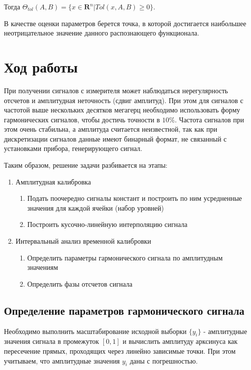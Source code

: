 \documentclass[12pt,a4paper]{article}
\begin{document}
Тогда $\Theta_{tol}(A,B)=\{x\in{\mathbf{R}^n}|Tol(x,A,B)\geq0\}$.

В качестве оценки параметров берется точка, в которой достигается наибольшее неотрицательное значение данного распознающего функционала.

\section{Ход работы}
При получении сигналов с измерителя может наблюдаться нерегулярность отсчетов и амплитудная неточность (сдвиг амплитуд). При этом для сигналов с частотой выше нескольких десятков мегагерц необходимо использовать форму гармонических сигналов, чтобы достичь точности в $10\%$. Частота сигналов при этом очень стабильна, а амплитуда считается неизвестной, так как при дискретизации сигналов данные имеют бинарный формат, не связанный с установками прибора, генерирующего сигнал.

Таким образом, решение задачи разбивается на этапы:
\begin{enumerate}
    \item Амплитудная калибровка
        \begin{enumerate}
            \item Подать поочередно сигналы констант и построить по ним усредненные значения для каждой ячейки (набор уровней)
            \item Построить кусочно-линейную интерполяцию сигнала 
        \end{enumerate}
    \item Интервальный анализ временной калибровки
        \begin{enumerate}
            \item Определить параметры гармонического сигнала по амплитудным значениям
            \item Определить фазы отсчетов сигнала
        \end{enumerate}
\end{enumerate}

\subsection{Определение параметров гармонического сигнала}
Необходимо выполнить масштабирование исходной выборки $\{y_i\}$ - амплитудные значения сигнала в промежуток $[0,1]$ и вычислить амплитуду арксинуса как пересечение прямых, проходящих через линейно зависимые точки. При этом учитываем, что амплитудные значения $y_i$ даны с погрешностью.
\end{document}

